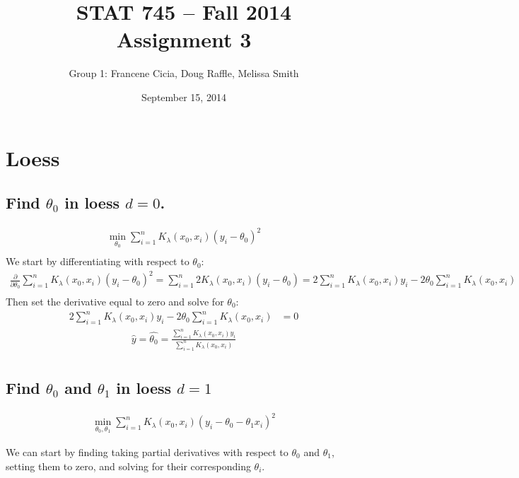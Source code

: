 \documentclass[a4paper]{article}
\title{\vspace{-30pt}STAT 745 -- Fall 2014\\Assignment 3}
\author{Group 1: Francene Cicia, Doug Raffle, Melissa Smith}
\date{September 15, 2014}
\begin{document}
\setlength{\parindent}{0pt}
\vspace{-50pt}
\maketitle

\section{Loess}
\subsection{Find $\theta_0$ in loess $d=0$.}
\begin{align*}
  \min_{\theta_0} \sum\limits_{i=1}^n K_\lambda(x_0, x_i)(y_i-\theta_0)^2\\
\end{align*}
We start by differentiating with respect to $\theta_0$:\\
\begin{align*}
  \frac{\partial}{\partial \theta_0} \sum\limits_{i=1}^n K_\lambda(x_0, x_i)(y_i-\theta_0)^2
  = \sum\limits_{i=1}^n 2 K_\lambda(x_0, x_i)(y_i-\theta_0)
  = 2\sum\limits_{i=1}^n K_\lambda(x_0, x_i)y_i - 
     2\theta_0\sum\limits_{i=1}^n K_\lambda(x_0, x_i)\\
\end{align*}
Then set the derivative equal to zero and solve for $\theta_0$:\\
\begin{align*}     
  2\sum\limits_{i=1}^n K_\lambda(x_0, x_i)y_i - 
     2\theta_0\sum\limits_{i=1}^n K_\lambda(x_0, x_i) &= 0
\end{align*}
\begin{align*}
  \hat{y}=\hat{\theta_0} = \frac{\sum\limits_{i=1}^n K_\lambda(x_0, x_i)y_i}
                   {\sum\limits_{i=1}^n K_\lambda(x_0, x_i)}\\
\end{align*}

\subsection{Find $\theta_0$ and $\theta_1$ in loess $d=1$}
\begin{align*}
  \min_{\theta_0, \theta_1} \sum\limits_{i=1}^n K_\lambda(x_0, x_i)(y_i-\theta_0 - \theta_1x_i)^2
\end{align*}

We can start by finding taking partial derivatives with respect to
$\theta_0$ and $\theta_1$, setting them to zero, and solving for their
corresponding $\theta_i$.
\end{document}
